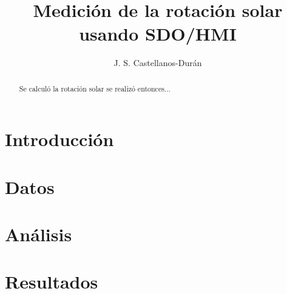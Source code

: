 \documentclass[12pt,letterpaper]{article}
\author{J. S. Castellanos-Durán}
\title{Medición de la rotación solar usando SDO/HMI}
\date{}
\begin{document}
 \maketitle
 
 \begin{abstract}
 Se calculó la rotación solar  se realizó entonces...
 \end{abstract}
 
 \section{Introducción}
 \citep{Howard1990}
 \section{Datos}
 
 \section{Análisis}
 
 \section{Resultados}
 
 
 
 
 
\end{document}
